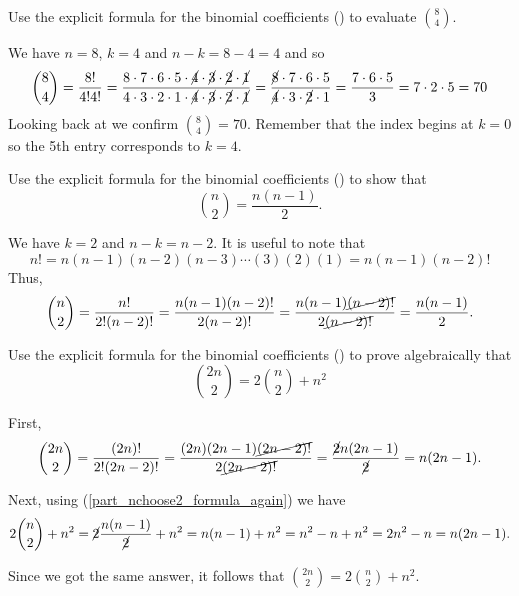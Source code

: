 \begin{exam}
\label{exam_using_formula_binom_coeffs}
~
    \begin{apart}
        \item Use the explicit formula for the binomial coefficients () to evaluate $\binom{8}{4}$.
            \begin{soln}
                We have $n=8$, $k=4$ and $n-k=8-4=4$ and so
                $$\binom{8}{4} = \frac{8!}{4! 4!} = 
                \frac{8\cdot 7 \cdot 6 \cdot 5 \cdot \cancel{4} \cdot \cancel{3} \cdot \cancel{2} \cdot \cancel{1}}
                {4 \cdot 3 \cdot 2 \cdot 1 \cdot \cancel{4} \cdot \cancel{3} \cdot \cancel{2} \cdot \cancel{1}}
                = \frac{\cancel{8}\cdot 7 \cdot 6 \cdot 5}{\cancel{4} \cdot 3 \cdot \cancel{2} \cdot 1}
                = \frac{7 \cdot 6 \cdot 5}{3}
                =7 \cdot 2 \cdot 5
                =70
                $$
                Looking back at  we confirm $\binom{8}{4}=70$.  Remember that the index begins at $k=0$ so the 5th entry corresponds to $k=4$.
            \end{soln}
        \item \label{part_nchoose2_formula_again}Use the explicit formula for the binomial coefficients () to show that $$\binom{n}{2} = \frac{n(n-1)}{2}.$$
            \begin{soln}
                We have $k=2$ and $n-k = n-2$. It is useful to note that $$n! = n(n-1)(n-2)(n-3) \cdots (3)(2)(1) = n(n-1)(n-2)!$$
                Thus, 
                $$\binom{n}{2} 
                = \frac{n!}{2!(n-2)!} 
                = \frac{n(n-1)(n-2)!}{2(n-2)!}
                = \frac{n(n-1)\cancel{(n-2)!}}{2\cancel{(n-2)!}}
                = \frac{n(n-1)}{2}.
                $$
            \end{soln}
        \item Use the explicit formula for the binomial coefficients () to prove algebraically that
        $$\binom{2n}{2} = 2\binom{n}{2} + n^2$$
            \begin{soln}
                First, 
                $$\displaystyle \binom{2n}{2} 
                = \frac{(2n)!}{2!(2n-2)!} 
                = \frac{(2n)(2n-1)\cancel{(2n-2)!}}{2\cancel{(2n-2)!}}
                =\frac{\cancel{2}n(2n-1)}{\cancel{2}} = n(2n-1).$$ 

                Next, using (\ref{part_nchoose2_formula_again}) we have $$2\binom{n}{2} + n^2 = \cancel{2} \frac{n(n-1)}{\cancel{2}} + n^2 = n(n-1)+ n^2 = n^2-n+n^2=2n^2-n = n(2n-1).$$

                Since we got the same answer, it follows that $\displaystyle \binom{2n}{2} = 2\binom{n}{2} + n^2$. 
            \end{soln}
    \end{apart}
\end{exam}

